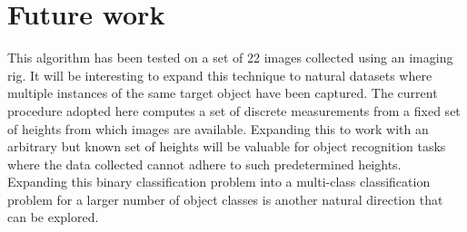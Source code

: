 \documentclass {udthesis}
\begin{document}
\section{Future work}

This algorithm has been tested on a set of 22 images collected using an imaging rig. It will be interesting to expand this technique to natural datasets where multiple instances of the same target object have been captured. The current procedure adopted here computes a set of discrete measurements from a fixed set of heights from which images are available. Expanding this to work with an arbitrary but known set of heights will be valuable for object recognition tasks where the data collected cannot adhere to such predetermined heights. Expanding this binary classification problem into a multi-class classification problem for a larger number of object classes is another natural direction that can be explored.


\printglossary[type=\acronymtype]                  
\end{document}
